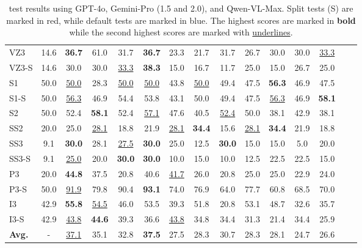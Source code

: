 \begin{table*}[t]
{\begin{tabular}{lcccccccccccccc}
    \cellcolor{myblue!34.0} VZ3 & 14.6 & \textbf{36.7} & 61.0 & 31.7 & \textbf{36.7} & 23.3 & 21.7 & 31.7 & 26.7 & 30.0 & 30.0 & \underline{33.3} \\
    \cellcolor{myred!34.0} VZ3-S & 14.6 & 30.0 & 30.0 & \underline{33.3} & \textbf{38.3} & 15.0 & 16.7 & 11.7 & 25.0 & 15.0 & 26.7 & 25.0 \\
    \midrule
    \cellcolor{myblue!34.0} S1 & 50.0 & \underline{50.0} & 28.3 & \underline{50.0} & \underline{50.0} & 43.8 & \underline{50.0} & 49.4 & 47.5 & \textbf{56.3} & 46.9 & 47.5 \\
    \cellcolor{myred!34.0} S1-S & 50.0 & \underline{56.3} & 46.9 & 54.4 & 53.8 & 43.1 & 50.0 & 49.4 & 47.5 & \underline{56.3} & 46.9 & \textbf{58.1} \\
    \cellcolor{myblue!34.0} S2 & 50.0 & 52.4 & \textbf{58.1} & 52.4 & \underline{57.1} & 47.6 & 40.5 & \underline{52.4} & 50.0 & 38.1 & 42.9 & 38.1 \\
    \midrule
    \cellcolor{myblue!34.0} SS2 & 20.0 & 25.0 & \underline{28.1} & 18.8 & 21.9 & \underline{28.1} & \textbf{34.4} & 15.6 & \underline{28.1} & \textbf{34.4} & 21.9 & 18.8 \\
    \cellcolor{myblue!34.0} SS3 & 9.1 & \textbf{30.0} & 28.1 & \underline{27.5} & \textbf{30.0} & 25.0 & 12.5 & \textbf{30.0} & 15.0 & 15.0 & 5.0 & 20.0 \\
    \cellcolor{myred!34.0} SS3-S & 9.1 & \underline{25.0} & 20.0 & \textbf{30.0} & \textbf{30.0} & 10.0 & 15.0 & 10.0 & 12.5 & 22.5 & 22.5 & 15.0 \\
    \midrule
    \cellcolor{myblue!34.0} P3 & 20.0 & \textbf{44.8} & 37.5 & 20.8 & 40.6 & \underline{41.7} & 26.0 & 20.8 & 25.0 & 25.0 & 22.9 & 24.0 \\
    \cellcolor{myred!34.0} P3-S & 50.0 & \underline{91.9} & 79.8 & 90.4 & \textbf{93.1} & 74.0 & 76.9 & 64.0 & 77.7 & 60.8 & 68.5 & 70.0 \\
    \midrule
    \cellcolor{myblue!34.0} I3 & 42.9 & \textbf{55.8} & \underline{54.5} & 46.0 & 53.5 & 39.3 & 51.8 & 20.8 & 53.1 & 48.7 & 32.6 & 35.7 \\
    \cellcolor{myred!34.0} I3-S & 42.9 & \underline{43.8} & \textbf{44.6} & 39.3 & 36.6 & \underline{43.8} & 34.8 & 34.4 & 31.3 & 21.4 & 34.4 & 25.9 \\
    \midrule
    \cellcolor{myblue!34.0} \bf Avg. & - & \underline{37.1} & 35.1 & 32.8  & \textbf{37.5}  & 27.5  & 28.3  & 30.7  & 28.3  & 28.1  & 24.7  & 26.6 \\
    \bottomrule
    \end{tabular}
    }
    \caption{{\methodname} test results using GPT-4o, Gemini-Pro (1.5 and 2.0), and Qwen-VL-Max. Split tests (S) are marked in \colorbox{myred!34}{red}, while default tests are marked in \colorbox{myblue!34}{blue}. The highest scores are marked in \textbf{bold} while the second highest scores are marked with \underline{underlines}.}
    \label{tab:main}
\end{table*}

